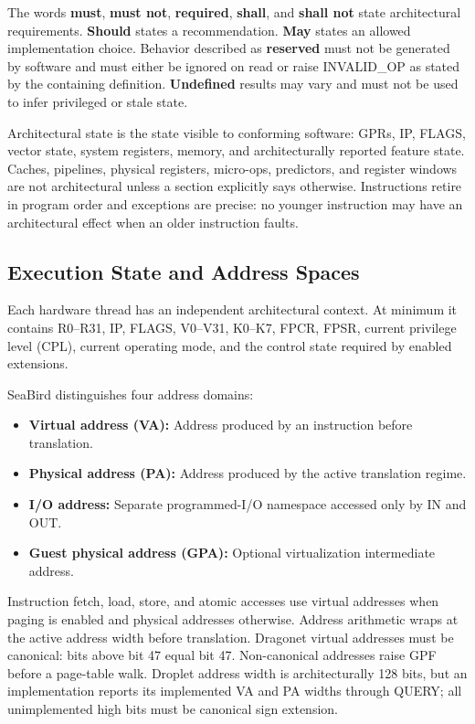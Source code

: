 \documentclass[11pt]{article}
\begin{document}
The words \textbf{must}, \textbf{must not}, \textbf{required}, \textbf{shall}, and \textbf{shall not} state architectural requirements. \textbf{Should} states a recommendation. \textbf{May} states an allowed implementation choice. Behavior described as \textbf{reserved} must not be generated by software and must either be ignored on read or raise INVALID\_OP as stated by the containing definition. \textbf{Undefined} results may vary and must not be used to infer privileged or stale state.

Architectural state is the state visible to conforming software: GPRs, IP, FLAGS, vector state, system registers, memory, and architecturally reported feature state. Caches, pipelines, physical registers, micro-ops, predictors, and register windows are not architectural unless a section explicitly says otherwise. Instructions retire in program order and exceptions are precise: no younger instruction may have an architectural effect when an older instruction faults.

\subsection{Execution State and Address Spaces}

Each hardware thread has an independent architectural context. At minimum it contains R0--R31, IP, FLAGS, V0--V31, K0--K7, FPCR, FPSR, current privilege level (CPL), current operating mode, and the control state required by enabled extensions.

SeaBird distinguishes four address domains:
\begin{itemize}
    \item \textbf{Virtual address (VA):} Address produced by an instruction before translation.
    \item \textbf{Physical address (PA):} Address produced by the active translation regime.
    \item \textbf{I/O address:} Separate programmed-I/O namespace accessed only by IN and OUT.
    \item \textbf{Guest physical address (GPA):} Optional virtualization intermediate address.
\end{itemize}

Instruction fetch, load, store, and atomic accesses use virtual addresses when paging is enabled and physical addresses otherwise. Address arithmetic wraps at the active address width before translation. Dragonet virtual addresses must be canonical: bits above bit 47 equal bit 47. Non-canonical addresses raise GPF before a page-table walk. Droplet address width is architecturally 128 bits, but an implementation reports its implemented VA and PA widths through QUERY; all unimplemented high bits must be canonical sign extension.
\end{document}
